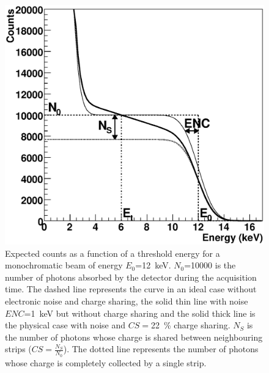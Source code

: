 \begin{figure}
\caption{Expected counts as a function of a threshold energy for a monochromatic beam of energy $E_0$=12~keV. $N_0$=10000 is the number of photons absorbed by the detector during the acquisition time. The dashed line represents the curve in an ideal case without electronic noise and charge sharing, the solid thin line with noise  $ENC$=1~keV but without charge sharing and the solid thick line is the physical case with noise and $CS=$22~\% charge sharing. $N_S$ is the number of photons whose charge is shared between neighbouring strips ($CS=\frac{N_S}{N_0}$). The dotted line represents the number of photons whose charge is completely collected by a single strip.}\label{fig:thrscanexpl}
\includegraphics[width=\textwidth]{fig4.eps}
\end{figure} 



